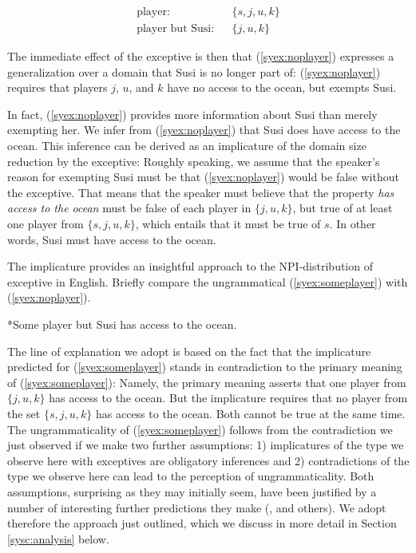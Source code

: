 \documentclass[output=paper,colorlinks,citecolor=brown,
]{langscibook}
\begin{document}
\begin{eqnarray*}
\text{player}: && \{s, j, u, k\} \\
\text{player but Susi}: && \{j, u, k\}
\end{eqnarray*}

The immediate effect of the exceptive is then that (\ref{syex:noplayer}) expresses a generalization over a domain that Susi is no longer part of:
(\ref{syex:noplayer}) requires that players $j$, $u$, and $k$ have no access to the ocean, but exempts Susi.

In fact, (\ref{syex:noplayer}) provides more information about Susi than merely exempting her. We infer from (\ref{syex:noplayer}) that  Susi does have access to the ocean. This inference can be derived as an implicature of the domain size reduction by the exceptive: Roughly speaking, we assume that the speaker's reason for exempting Susi must be that (\ref{syex:noplayer}) would be false without the exceptive.  That means that the speaker must believe that the property \emph{has access to the ocean} must be false of each player in $\{j, u, k\}$, but true of at least one player from $\{s, j, u, k\}$, which entails that it must be true of $s$. In other words, Susi must have access to the ocean.

The implicature provides an insightful approach to the NPI-distribution of exceptive in English.  Briefly compare the ungrammatical (\ref{syex:someplayer}) with (\ref{syex:noplayer}).  

\ea \label{syex:someplayer} 
   *Some player but Susi has access to the ocean.\z

The line of explanation we adopt is based on the fact that the implicature predicted for (\ref{syex:someplayer}) stands in contradiction to the primary meaning of (\ref{syex:someplayer}): Namely, the primary meaning asserts that one player from $\{j, u, k\}$ has access to the ocean.  But the implicature requires that no player from the set $\{s, j, u, k\}$ has access to the ocean. Both cannot be true at the same time.  The ungrammaticality of (\ref{syex:someplayer}) follows from the contradiction we just observed if we make two further assumptions: 1) implicatures of the type we observe here with exceptives are obligatory inferences and 2) contradictions of the type we observe here can lead to the perception of ungrammaticality.  Both assumptions, surprising as they may initially seem, have been justified by a number of interesting further predictions they make (\citealt{chierchia13a}, and others).  We adopt therefore the approach just outlined, which we discuss in more detail in Section \ref{sysc:analysis} below.
\end{document}
